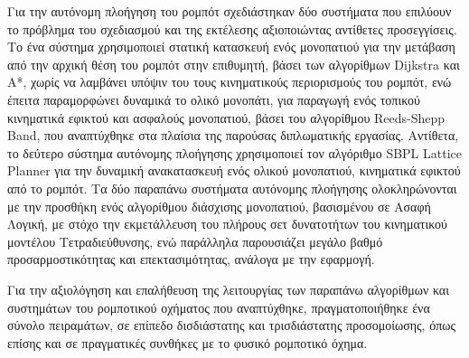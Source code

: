 \documentclass[
11pt, %
twoside, %
openright,
english,
headsepline, %
]{MastersDoctoralThesis} %
\begin{document}
\begin{summary}
\bigskip
Για την αυτόνομη πλοήγηση του ρομπότ σχεδιάστηκαν δύο συστήματα που επιλύουν το πρόβλημα του σχεδιασμού και της εκτέλεσης αξιοποιώντας αντίθετες προσεγγίσεις. Το ένα σύστημα χρησιμοποιεί στατική κατασκευή ενός μονοπατιού για την μετάβαση από την αρχική θέση του ρομπότ στην επιθυμητή, βάσει των αλγορίθμων Dijkstra και Α*, χωρίς να λαμβάνει υπόψιν του τους κινηματικούς περιορισμούς του ρομπότ, ενώ έπειτα παραμορφώνει δυναμικά το ολικό μονοπάτι, για παραγωγή ενός τοπικού κινηματικά εφικτού και ασφαλούς μονοπατιού, βάσει του αλγορίθμου Reeds-Shepp Band, που αναπτύχθηκε στα πλαίσια της παρούσας διπλωματικής εργασίας. Αντίθετα, το δεύτερο σύστημα αυτόνομης πλοήγησης χρησιμοποιεί τον αλγόριθμο SBPL Lattice Planner για την δυναμική ανακατασκευή ενός ολικού μονοπατιού, κινηματικά εφικτού από το ρομπότ. Τα δύο παραπάνω συστήματα αυτόνομης πλοήγησης ολοκληρώνονται με την προσθήκη ενός αλγορίθμου διάσχισης μονοπατιού, βασισμένου σε Ασαφή Λογική, με στόχο την εκμετάλλευση του πλήρους σετ δυνατοτήτων του κινηματικού μοντέλου Τετραδιεύθυνσης, ενώ παράλληλα παρουσιάζει μεγάλο βαθμό προσαρμοστικότητας και επεκτασιμότητας, ανάλογα με την εφαρμογή.

\bigskip
Για την αξιολόγηση και επαλήθευση της λειτουργίας των παραπάνω αλγορίθμων και συστημάτων του ρομποτικού οχήματος που αναπτύχθηκε, πραγματοποιήθηκε ένα σύνολο πειραμάτων, σε επίπεδο δισδιάστατης και τρισδιάστατης προσομοίωσης, όπως επίσης και σε πραγματικές συνθήκες με το φυσικό ρομποτικό όχημα.
\end{summary}


\end{document}
